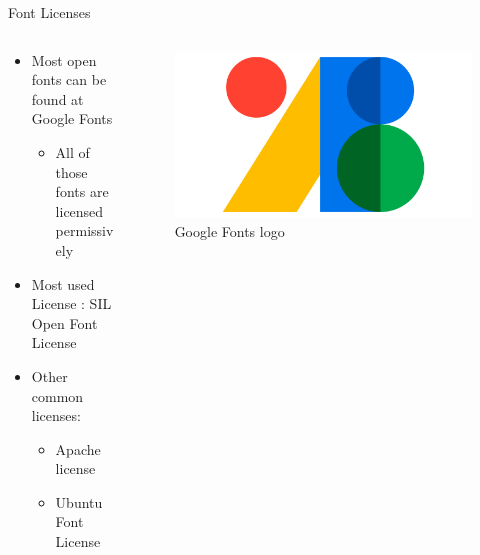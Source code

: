 \documentclass[compress,aspectratio=169]{beamer}
\begin{document}
	\begin{frame}{Font Licenses}
    \begin{columns}
      \begin{column}{0.7\textwidth}
		    \begin{itemize}
          \item Most open fonts can be found at Google Fonts \cite{gfonts}
            \begin{itemize}
              \item All of those fonts are licensed permissively
            \end{itemize}
          \item Most used License \cite{gfontsfaq}: SIL Open Font License \cite{ofl}
          \item Other common licenses:
            \begin{itemize}
              \item Apache license \cite{apache2}
              \item Ubuntu Font License \cite{ufl}
            \end{itemize}
		    \end{itemize}
      \end{column}
      \begin{column}{0.3\textwidth}
        \begin{figure}
          \includegraphics[width=\textwidth]{./assets/gfonts.png}
          \caption{Google Fonts logo \cite{gfonts}}
        \end{figure}
      \end{column}
    \end{columns}
	\end{frame}
\end{document}
